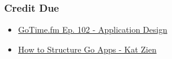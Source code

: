 
\begin{frame}
  \frametitle{Credit Due}
  \centering
  \begin{itemize}
    \item \href{https://changelog.com/gotime/102}{GoTime.fm Ep. 102 - Application Design}
    \item \href{https://www.youtube.com/watch?v=oL6JBUk6tj0}{How to Structure Go Apps - Kat Zien}
  \end{itemize}
\end{frame}
